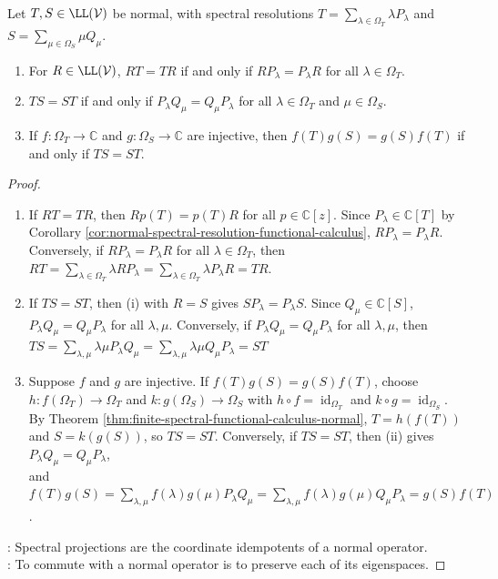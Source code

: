 \begin{theorem} \label{thm:normal-spectral-projection-commutativity} \\
Let $T,S\in\LL(\mathcal{V})$ be normal, with spectral resolutions $T=\sum\limits_{\lambda\in\Omega_T}\lambda P_{\lambda}$ and $S=\sum\limits_{\mu\in\Omega_S}\mu Q_{\mu}$.
\begin{enumerate}[label=(\roman*)]
\setlength{\itemsep}{0pt}
\item For $R\in\LL(\mathcal{V})$, $RT=TR$ if and only if $RP_{\lambda}=P_{\lambda}R$ for all $\lambda\in\Omega_T$.
\item $TS=ST$ if and only if $P_{\lambda}Q_{\mu}=Q_{\mu}P_{\lambda}$ for all $\lambda\in\Omega_T$ and $\mu\in\Omega_S$.
\item If $f:\Omega_T\to\mathbb{C}$ and $g:\Omega_S\to\mathbb{C}$ are injective, then $f(T)g(S)=g(S)f(T)$ if and only if $TS=ST$.
\end{enumerate}
\begin{proof}
\begin{enumerate}[label=(\roman*).]
\setlength{\itemsep}{0pt}
\item If $RT=TR$, then $Rp(T)=p(T)R$ for all $p\in\mathbb{C}[z]$. Since $P_{\lambda}\in\mathbb{C}[T]$ by Corollary \ref{cor:normal-spectral-resolution-functional-calculus}, $RP_{\lambda}=P_{\lambda}R$. Conversely, if $RP_{\lambda}=P_{\lambda}R$ for all $\lambda\in\Omega_T$, then $RT=\sum\limits_{\lambda\in\Omega_T}\lambda RP_{\lambda} =\sum\limits_{\lambda\in\Omega_T}\lambda P_{\lambda}R =TR$.
\item If $TS=ST$, then (i) with $R=S$ gives $SP_{\lambda}=P_{\lambda}S$. Since $Q_{\mu}\in\mathbb{C}[S]$, $P_{\lambda}Q_{\mu}=Q_{\mu}P_{\lambda}$ for all $\lambda,\mu$. Conversely, if $P_{\lambda}Q_{\mu}=Q_{\mu}P_{\lambda}$ for all $\lambda,\mu$, then $TS=\sum\limits_{\lambda,\mu}\lambda\mu P_{\lambda}Q_{\mu} =\sum\limits_{\lambda,\mu}\lambda\mu Q_{\mu}P_{\lambda} =ST$
\item Suppose $f$ and $g$ are injective. If $f(T)g(S)=g(S)f(T)$, choose $h:f(\Omega_T)\to\Omega_T$ and $k:g(\Omega_S)\to\Omega_S$ with $h\circ f=\operatorname{id}_{\Omega_T}$ and $k\circ g=\operatorname{id}_{\Omega_S}$. By Theorem \ref{thm:finite-spectral-functional-calculus-normal}, $T=h(f(T))$ and $S=k(g(S))$, so $TS=ST$. Conversely, if $TS=ST$, then (ii) gives $P_{\lambda}Q_{\mu}=Q_{\mu}P_{\lambda}$,\\
and $f(T)g(S)=\sum\limits_{\lambda,\mu}f(\lambda)g(\mu)P_{\lambda}Q_{\mu} =\sum\limits_{\lambda,\mu}f(\lambda)g(\mu)Q_{\mu}P_{\lambda} =g(S)f(T)$.
\end{enumerate}
: Spectral projections are the coordinate idempotents of a normal operator.\\
: To commute with a normal operator is to preserve each of its eigenspaces.
\end{proof}
\end{theorem}

